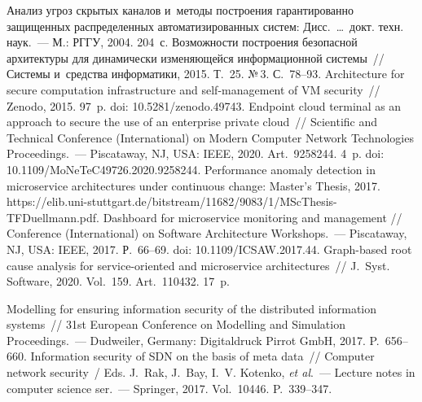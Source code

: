 \begin{multicols}{2}
{{\begin{thebibliography}{99}
 Анализ угроз скрытых каналов и~методы построения гарантированно 
защищенных распределенных автоматизированных систем: Дисс.\ \ldots\  докт. техн. наук.~--- 
М.: РГГУ, 2004. 204~с.
 Возможности построения 
безопасной архитектуры для динамически изменяющейся информационной сис\-те\-мы~//  
Сис\-те\-мы и~средства информатики, 2015. Т.~25. №\,3. С.~78--93. 
 Architecture for secure computation infrastructure and self-management of VM 
security~// Zenodo, 2015. 97~p. doi: 10.5281/zenodo.49743.
 Endpoint cloud terminal as an 
approach to secure the use of an enterprise private cloud~// Scientific and Technical Conference 
(International) on Modern Computer Network Technologies Proceedings.~--- Piscataway, NJ, USA: 
IEEE, 2020. Art.\ 9258244. 4~p. doi: 10.1109/MoNeTeC49726.2020.9258244.
 Performance anomaly detection in microservice architectures 
under continuous change: Master's Thesis, 2017. {\sf 
https://elib.uni-stuttgart.de/\linebreak bitstream/11682/9083/1/MScThesis-TFDuellmann.pdf}.
 Dashboard for microservice monitoring and management //  
Conference (International) on Software Architecture Workshops.~--- Piscataway, NJ, USA: IEEE, 
2017. Р.~66--69. doi: 10.1109/\linebreak ICSAW.2017.44.
 Graph-based root cause analysis for service-oriented and 
microservice architectures~// J.~Syst. Software, 2020. Vol.~159. Art.\ 110432. 17~p.

 Modelling for ensuring information security of 
the distributed information systems~// 31st European Conference on Modelling and Simulation 
Proceedings.~--- Dudweiler, Germany: Digitaldruck Pirrot GmbH, 2017. P.~656--660.
 Information security of 
SDN on the basis of meta data~// Computer network security~/
Eds. J.~Rak, J.~Bay, I.~V. Kotenko, \textit{et al}.~--- Lecture notes in computer science ser.~--- Springer, 2017. Vol.~10446. P.~339--347.


\end{thebibliography}}}
\end{multicols}
